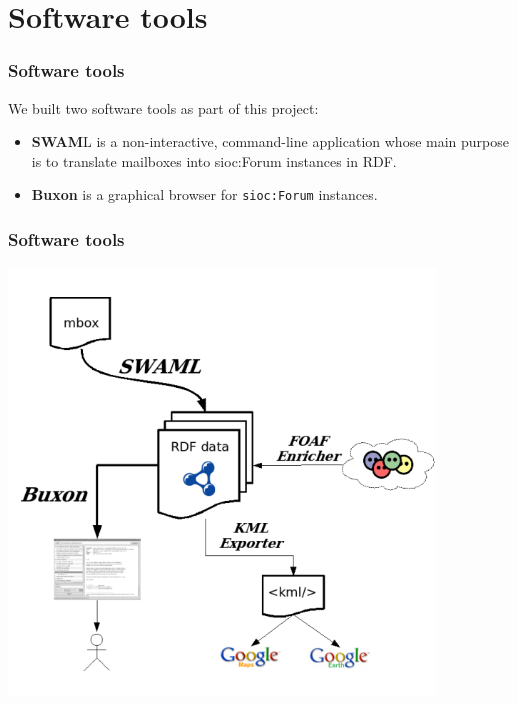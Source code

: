 \documentclass[spanish,notes=hide,16pt]{beamer}
\begin{document}
\section{Software tools}
\frame
{
  \frametitle{Software tools}

  We built two software tools as part of this project:
  \vspace{0.5cm}
  \begin{itemize}
    \item<2->	\begin{Large}\textbf{SWAM}L is a non-interactive, 
		command-line application whose main purpose is to 
		translate mailboxes into sioc:Forum instances in 
		RDF.\end{Large}
    \vspace{0.5cm}
    \item<3->	\begin{Large}\textbf{Buxon} is a graphical browser 
		for \texttt{sioc:Forum} instances.\end{Large}
  \end{itemize}
}
\frame
{
  \frametitle{Software tools}

  \begin{center}
    \includegraphics[width=0.85\textwidth]{images/swaml-tools.png}
  \end{center}
}
\frame
\end{document}
